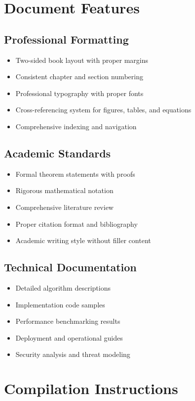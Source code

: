 \documentclass[11pt,a4paper]{article}
\begin{document}
\section{Document Features}

\subsection{Professional Formatting}
\begin{itemize}
\item Two-sided book layout with proper margins
\item Consistent chapter and section numbering
\item Professional typography with proper fonts
\item Cross-referencing system for figures, tables, and equations
\item Comprehensive indexing and navigation
\end{itemize}

\subsection{Academic Standards}
\begin{itemize}
\item Formal theorem statements with proofs
\item Rigorous mathematical notation
\item Comprehensive literature review
\item Proper citation format and bibliography
\item Academic writing style without filler content
\end{itemize}

\subsection{Technical Documentation}
\begin{itemize}
\item Detailed algorithm descriptions
\item Implementation code samples
\item Performance benchmarking results
\item Deployment and operational guides
\item Security analysis and threat modeling
\end{itemize}

\section{Compilation Instructions}
\end{document}
